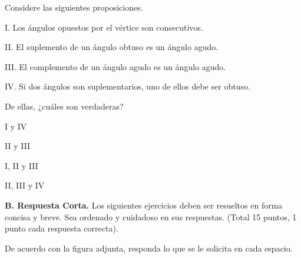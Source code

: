 \documentclass[12pt, fleqn]{article}
\begin{document}
\item  Considere las siguientes proposiciones. \vs

\begin{tcolorbox}
\benu
\item[I.] Los ángulos opuestos por el vértice son consecutivos.
\item[II.] El suplemento de un ángulo obtuso es un ángulo agudo.
\item[III.] El complemento de un ángulo agudo es un ángulo agudo.
\item[IV.] Si dos ángulos son suplementarios, uno de ellos debe ser obtuso.
\eenu
\end{tcolorbox}
\vp

De ellas, ¿cuáles son {\sc verdaderas}? \vp

\benu
\item[] \opc I y IV \vf
\item[] \opc II y III \vf
\item[] \opc I, II y III \vf
\item[] \opc II, III y IV
\eenu

\eenu

\pagebreak

{\bf B. Respuesta Corta.} Los siguientes ejercicios deben ser resueltos en forma concisa y breve. Sea ordenado y cuidadoso en sus respuestas. (Total 15 puntos, 1 punto cada respuesta correcta).\vp

\benu
\item De acuerdo con la figura adjunta, responda lo que se le solicita en cada espacio. \vs
\end{document}
